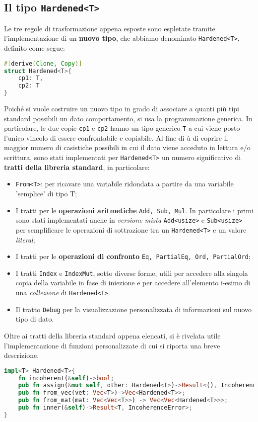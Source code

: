 \subsection{Il tipo \texttt{Hardened<T>}}
Le tre regole di trasformazione appena esposte sono espletate tramite l'implementazione di un \textbf{nuovo tipo}, che abbiamo denominato \texttt{Hardened<T>}, definito come segue: 

\begin{lstlisting}[language=Rust, style=boxed]
#[derive(Clone, Copy)]
struct Hardened<T>{
    cp1: T, 
    cp2: T
}
\end{lstlisting}
\noindent
Poiché si vuole costruire un nuovo tipo in grado di associare a quanti più tipi standard possibili un dato comportamento, si usa la programmazione generica. In particolare, le due copie \texttt{cp1} e \texttt{cp2} hanno un tipo generico \texttt{T} a cui viene posto l'unico vincolo di essere confrontabile e copiabile.
Al fine di ù di coprire il maggior numero di casistiche possibili in cui il dato viene acceduto in lettura e/o scrittura, sono stati implementati per \texttt{Hardened<T>} un numero significativo di \textbf{tratti della libreria standard}, in particolare: 
\begin{itemize}
    \itemsep-0.3em
    \item \texttt{From<T>}: per ricavare una variabile ridondata a partire da una variabile 'semplice' di tipo T; 
    \item I tratti per le \textbf{operazioni aritmetiche} \texttt{Add, Sub, Mul}. In particolare i primi sono stati implementati anche in \textit{versione mista} \texttt{Add<usize>} e \texttt{Sub<usize>} per semplificare le operazioni di sottrazione tra un \texttt{Hardened<T>} e un valore \textit{literal}; 
    \item I tratti per le \textbf{operazioni di confronto} \texttt{Eq, PartialEq, Ord, PartialOrd}; 
    \item I tratti \texttt{Index} e \texttt{IndexMut}, sotto diverse forme, utili per accedere alla singola copia della variabile  in fase di iniezione e per accedere all'elemento i-esimo di una \textit{collezione} di \texttt{Hardened<T>}.
    \item Il tratto \texttt{Debug} per la visualizzazione personalizzata di informazioni sul nuovo tipo di dato.
\end{itemize}

\noindent
Oltre ai tratti della libreria standard appena elencati,  si è rivelata utile l'implementazione di funzioni personalizzate di cui si riporta una breve descrizione.
\begin{lstlisting}[language=Rust, style=boxed]
impl<T> Hardened<T>{
    fn incoherent(&self)->bool;
    pub fn assign(&mut self, other: Hardened<T>)->Result<(), IncoherenceError>;
    pub fn from_vec(vet: Vec<T>)->Vec<Hardened<T>>;
    pub fn from_mat(mat: Vec<Vec<T>>) -> Vec<Vec<Hardened<T>>>;
    pub fn inner(&self)->Result<T, IncoherenceError>;
}
\end{lstlisting}

